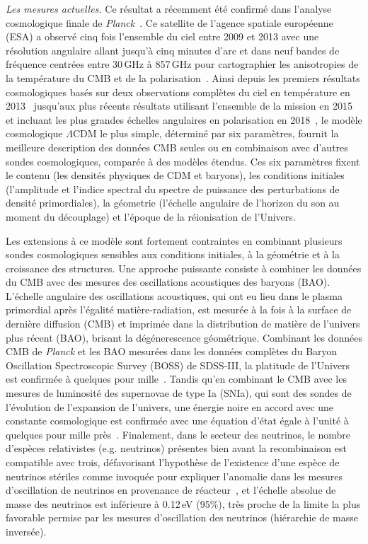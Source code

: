 \emph{Les mesures actuelles.} Ce résultat a récemment été
confirmé dans l'analyse cosmologique finale
de \emph{Planck}~\citep{Planck_2018_cosmo}. Ce satellite de l'agence
spatiale européenne (ESA) a observé cinq fois l'ensemble du ciel entre
2009 et 2013 avec une résolution angulaire allant jusqu'à cinq minutes
d'arc et dans neuf bandes de fréquence centrées entre 30\,GHz à
857\,GHz pour cartographier les anisotropies de la
température du CMB et de la polarisation~\citep{Planck_2013_mission,
Planck_2015_mission, Planck_2018_mission}. Ainsi depuis les premiers
résultats cosmologiques basés sur deux observations complètes du ciel
en température en 2013~\citep{Planck_2013_cosmo} jusqu'aux plus récents
résultats utilisant l'ensemble de la mission en
2015~\citep{Planck_2015_cosmo} et incluant les plus grandes échelles
angulaires en polarisation en 2018~\citep{Planck_2018_cosmo}, le modèle
cosmologique $\Lambda$CDM le plus simple, déterminé par six
paramètres, fournit la meilleure description des données CMB seules ou
en combinaison avec d'autres sondes cosmologiques, comparée à des
modèles étendus. Ces six paramètres fixent le contenu (les densités
physiques de CDM et baryons), les conditions initiales (l'amplitude et
l'indice spectral du spectre de puissance des perturbations de densité
primordiales), la géometrie (l'échelle angulaire de l'horizon du son
au moment du découplage) et l'époque de la réionisation de l'Univers. 

Les extensions à ce modèle sont fortement contraintes en combinant
plusieurs sondes cosmologiques sensibles aux conditions initiales, à
la géométrie et à la croissance des structures. 
Une approche puissante consiste à combiner les données du CMB avec des mesures des
oscillations acoustiques des baryons (BAO). L'échelle angulaire des
oscillations acoustiques, qui ont eu lieu dans
le plasma primordial après l'égalité matière-radiation, est mesurée à
la fois à la surface de dernière diffusion (CMB) et imprimée dans la
distribution de matière de l'univers plus récent (BAO), brisant la
dégénerescence géométrique. Combinant les
données CMB de \emph{Planck} et les BAO mesurées dans les données
complètes du Baryon Oscillation Spectroscopic Survey (BOSS) de
SDSS-III, la platitude de l'Univers est confirmée à quelques pour
mille~\citep{BOSS2017, Planck_2018_cosmo}. Tandis qu'en
combinant le CMB avec les mesures de luminosité des supernovae de type
Ia (SNIa), qui sont des sondes de l'évolution de l'expansion de
l'univers, une énergie noire en accord avec une constante cosmologique
est confirmée avec une équation d'état égale à l'unité à quelques pour
mille près~\citep{SNLS2014, PANSTARR2018, Planck_2018_cosmo}.
Finalement, dans le secteur des neutrinos, le nombre
d'espèces relativistes (e.g. neutrinos) présentes bien avant la
recombinaison est compatible avec trois, défavorisant l'hypothèse de
l'existence d'une espèce de neutrinos stériles comme invoquée pour expliquer
l'anomalie dans les mesures d'oscillation de neutrinos en provenance
de réacteur~\citep{LSND2001, STEREO2019}, et l'échelle absolue de masse des
neutrinos est inférieure à 0.12\,eV (95\%), très proche de la limite
la plus favorable permise par les mesures d'oscillation des neutrinos
(hiérarchie de masse inversée).\\


